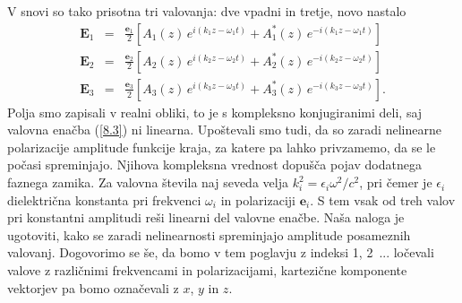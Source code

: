 V snovi so tako prisotna tri valovanja:
dve vpadni in tretje, novo nastalo
\begin{eqnarray}
\mathbf{E}_{1} & = & \frac{\mathbf{e}_{1}}{2}\left[A_{1}(z)\, 
e^{i(k_{1}z-\omega_{1}t)}+A_{1}^{*}(z)\, e^{-i(k_{1}z-\omega_{1}t)}\right]\nonumber \\
\mathbf{E}_{2} & = & \frac{\mathbf{e}_{2}}{2}\left[A_{2}(z)\, 
e^{i(k_{2}z-\omega_{2}t)}+A_{2}^{*}(z)\, e^{-i(k_{2}z-\omega_{2}t)}\right]\nonumber \\
\mathbf{E}_{3} & = & \frac{\mathbf{e}_{3}}{2}\left[A_{3}(z)\, 
e^{i(k_{3}z-\omega_{3}t)}+A_{3}^{*}(z)\, e^{-i(k_{3}z-\omega_{3}t)}\right].
\end{eqnarray}
Polja smo zapisali v realni obliki, to je s kompleksno konjugiranimi
deli, saj valovna enačba (\ref{8.3}) ni linearna. Upoštevali smo tudi,
da so zaradi nelinearne polarizacije amplitude funkcije kraja, za
katere pa lahko privzamemo, da se le počasi spreminjajo. Njihova kompleksna vrednost
dopušča pojav dodatnega faznega zamika. Za valovna
števila naj seveda velja $k_{i}^{2}=\epsilon_{i}\omega^{2}/c^{2}$,
pri čemer je $\epsilon_{i}$ dielektrična konstanta pri frekvenci
$\omega_{i}$ in polarizaciji $\mathbf{e}_{i}$. S tem vsak od treh valov
pri konstantni amplitudi reši linearni del valovne enačbe. Naša naloga
je ugotoviti, kako se zaradi nelinearnosti spreminjajo amplitude posameznih valovanj.
Dogovorimo se še, da bomo v tem poglavju z indeksi 1, 2~... ločevali
valove z različnimi frekvencami in polarizacijami, kartezične komponente
vektorjev pa bomo označevali z $x$, $y$ in $z$. 

